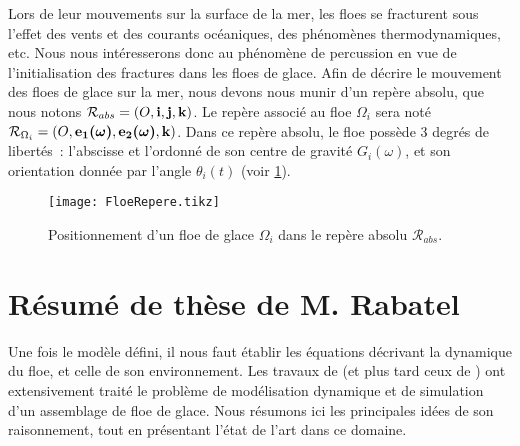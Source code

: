 

Lors de leur mouvements sur la surface de la mer, les floes se fracturent sous l'effet des vents et des courants océaniques, des phénomènes thermodynamiques, etc. Nous nous intéresserons donc au phénomène de percussion en vue de l'initialisation des fractures dans les floes de glace. Afin de décrire le mouvement des floes de glace sur la mer, nous devons nous munir d'un repère absolu, que nous notons $\mathcal{R}_{abs} = (O, \bm{\mathrm{i}}, \bm{\mathrm{j}}, \bm{\mathrm{k}})$. Le repère associé au floe $\Omega_i$ sera noté $\mathcal{R}_{\Omega_i} = (O, \bm {\bm{\mathrm{e}}_1(\omega)}, \bm{\mathrm{\bm{\mathrm{e}}_2(\omega)}}, \bm{\mathrm{k}})$. Dans ce repère absolu, le floe possède 3 degrés de libertés : l'abscisse et l'ordonné de son centre de gravité $G_i(\omega)$, et son orientation donnée par l'angle $\theta_i (t)$ (voir \cref{fig:FloeRepere}). 

\begin{figure}[!ht]
    \centering
    \texttt{[image: FloeRepere.tikz]}
    \caption{Positionnement d'un floe de glace $\Omega_i$ dans le repère absolu $\mathcal{R}_{abs}$.}
    \label{fig:FloeRepere}
\end{figure}



\section{Résumé de thèse de M. Rabatel}

Une fois le modèle défini, il nous faut établir les équations décrivant la dynamique du floe, et celle de son environnement. Les travaux de \citeauthor{rabatel2015thesis} (et plus tard ceux de \citeauthor{balasoiu2020halthesis}) ont extensivement traité le problème de modélisation dynamique et de simulation d'un assemblage de floe de glace. Nous résumons ici les principales idées de son raisonnement, tout en présentant l'état de l'art dans ce domaine.

